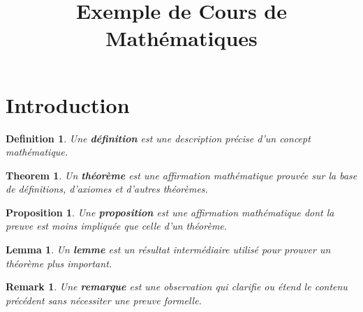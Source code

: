 \documentclass{article}
\title{Exemple de Cours de Mathématiques}
\author{}
\date{}
\newtheorem{theorem}{Theorem}[section]
\newenvironment{thm}
  {\begin{theobox}\begin{theorem}}
  {\end{theorem}\end{theobox}}
\newtheorem{definition}{Definition}[section]
\newenvironment{de}
  {\begin{defbox}\begin{definition}}
  {\end{definition}\end{defbox}}
\newtheorem{proposition}{Proposition}[section]
\newenvironment{prop}
  {\begin{propbox}\begin{proposition}}
  {\end{proposition}\end{propbox}}
\newtheorem{lemma}{Lemma}[section]
\newenvironment{lem}
  {\begin{lembox}\begin{lemma}}
  {\end{lemma}\end{lembox}}
\newtheorem{remark}{Remark}[section]
\newenvironment{rem}
  {\begin{rembox}\begin{remark}}
  {\end{remark}\end{rembox}}
\begin{document}
\maketitle

\section{Introduction}

\begin{de}
Une \textbf{définition} est une description précise d'un concept mathématique.
\end{de}

\begin{thm}
Un \textbf{théorème} est une affirmation mathématique prouvée sur la base de définitions, d'axiomes et d'autres théorèmes.
\end{thm}

\begin{prop}
Une \textbf{proposition} est une affirmation mathématique dont la preuve est moins impliquée que celle d'un théorème.
\end{prop}

\begin{lem}
Un \textbf{lemme} est un résultat intermédiaire utilisé pour prouver un théorème plus important.
\end{lem}

\begin{rem}
Une \textbf{remarque} est une observation qui clarifie ou étend le contenu précédent sans nécessiter une preuve formelle.
\end{rem}
\end{document}

